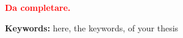 \begin{flushright}
    \textbf{\textcolor{red}{Da completare.}} \hfill
\end{flushright}
\textbf{Keywords:} here, the keywords, of your thesis
